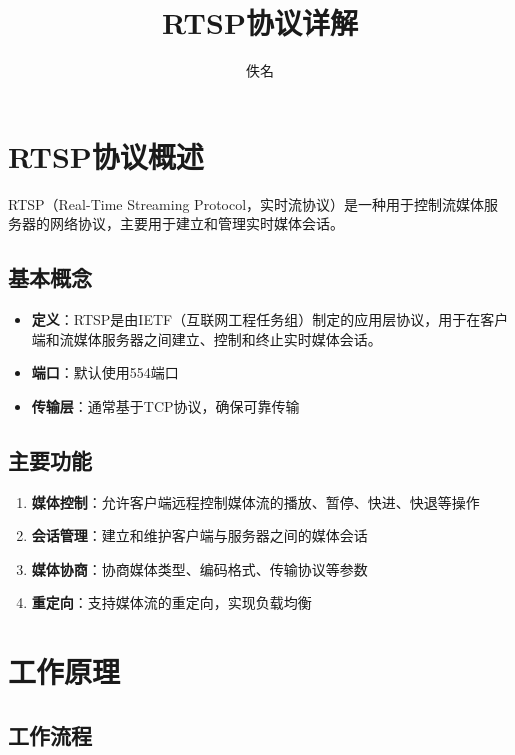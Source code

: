 \documentclass[12pt,UTF8]{ctexbook}
\title{\heiti\zihao{0} RTSP协议详解}
\author{佚名}
\date{}
\begin{document}
\maketitle
\tableofcontents

\frontmatter

\mainmatter

\chapter{RTSP协议概述}

RTSP（Real-Time Streaming Protocol，实时流协议）是一种用于控制流媒体服务器的网络协议，主要用于建立和管理实时媒体会话。

\section{基本概念}

\begin{itemize}
  \item \textbf{定义}：RTSP是由IETF（互联网工程任务组）制定的应用层协议，用于在客户端和流媒体服务器之间建立、控制和终止实时媒体会话。
  \item \textbf{端口}：默认使用554端口
  \item \textbf{传输层}：通常基于TCP协议，确保可靠传输
\end{itemize}

\section{主要功能}

\begin{enumerate}
  \item \textbf{媒体控制}：允许客户端远程控制媒体流的播放、暂停、快进、快退等操作
  \item \textbf{会话管理}：建立和维护客户端与服务器之间的媒体会话
  \item \textbf{媒体协商}：协商媒体类型、编码格式、传输协议等参数
  \item \textbf{重定向}：支持媒体流的重定向，实现负载均衡
\end{enumerate}

\chapter{工作原理}

\section{工作流程}
\end{document}
